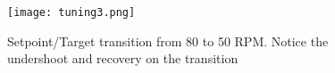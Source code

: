 \documentclass[openany,11pt,fleqn]{book} %
\begin{document}

\begin{figure}[]
    \begin{center}
        \hspace*{-3.4cm}
        \texttt{[image: tuning3.png]}
        \caption{Setpoint/Target transition from 80 to 50 RPM. Notice the undershoot and recovery on the transition}
        \label{tuning3}
    \end{center}
\end{figure}

%
%
%
%
%
%
%
%
%
%
\end{document}
